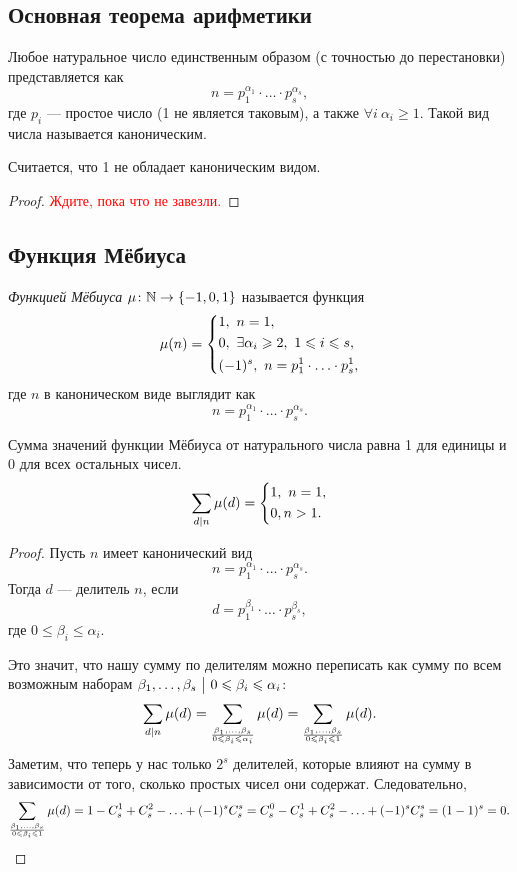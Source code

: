 \subsection{Основная теорема арифметики}

\begin{theorem}
	Любое натуральное число единственным образом (с точностью до перестановки) представляется как
	\[
	n = p_1^{\alpha_1} \cdot \ldots \cdot p_s^{\alpha_s},
	\]
	где $p_i$ --- простое число (1 не является таковым), а также $\forall i\ \alpha_i \ge 1$. Такой вид числа называется каноническим.
\end{theorem}

\begin{note}
	Считается, что 1 не обладает каноническим видом.
\end{note}

\begin{proof}
	\textcolor{red}{Ждите, пока что не завезли.}	
\end{proof}

\subsection{Функция Мёбиуса}

\begin{definition}
	\textit{Функцией Мёбиуса} $\mu \colon \mathbb{N} \rightarrow \{-1, 0, 1\}$ называется функция
	\[
		\mu(n) = \left\{\begin{aligned}
			&{1,\ n = 1,}
			\\
			&{0,\ \exists \alpha_i \geqslant 2,\ 1 \leqslant i \leqslant s,}
			\\
			&{(-1)^s,\ n = p_1^1 \cdot \ldots \cdot p_s^1,}
		\end{aligned}\right.
	\]
	где $n$ в каноническом виде выглядит как
	\[
		n = p_1^{\alpha_1} \cdot \ldots \cdot p_s^{\alpha_s}.
	\]
\end{definition}

\begin{lemma}
	Сумма значений функции Мёбиуса от натурального числа равна 1 для единицы и 0 для всех остальных чисел.
	\[
		\sum\limits_{d \mid n} \mu(d) = \left\{\begin{aligned}
			&{1,\ n = 1,}
			\\
			&{0, n > 1.}
		\end{aligned}\right.
	\]
\end{lemma}

\begin{proof}
	Пусть $n$ имеет канонический вид
	\[
		n = p_1^{\alpha_1} \cdot \ldots \cdot p_s^{\alpha_s}.
	\]
	Тогда $d$ --- делитель $n$, если
	\[
		d = p_1^{\beta_1} \cdot \ldots \cdot p_s^{\beta_s},
	\]
	где $0 \le \beta_i \le \alpha_i$.
	
	Это значит, что нашу сумму по делителям можно переписать как сумму по всем возможным наборам $\beta_1, \ldots, \beta_s \ \big|\  0 \leqslant \beta_i \leqslant \alpha_i$:
	\[
		\sum\limits_{d \mid n} \mu(d) = \sum\limits_{\beta_1, \ldots, \beta_s \over 0 \leqslant \beta_i \leqslant \alpha_i} \mu(d) = \sum\limits_{\beta_1, \ldots, \beta_s \over 0 \leqslant \beta_i \leqslant 1} \mu(d).
	\]
	Заметим, что теперь у нас только $2^s$ делителей, которые влияют на сумму в зависимости от того, сколько простых чисел они содержат. Следовательно,
	\[
		\sum\limits_{\beta_1, \ldots, \beta_s \over 0 \leqslant \beta_i \leqslant 1} \mu(d) = 1 - C_s^1 + C_s^2 - \ldots + (-1)^s C_s^s = \\
		C_s^0 - C_s^1 + C_s^2 - \ldots + (-1)^s C_s^s = (1 - 1)^s = 0.
	\]
\end{proof}

